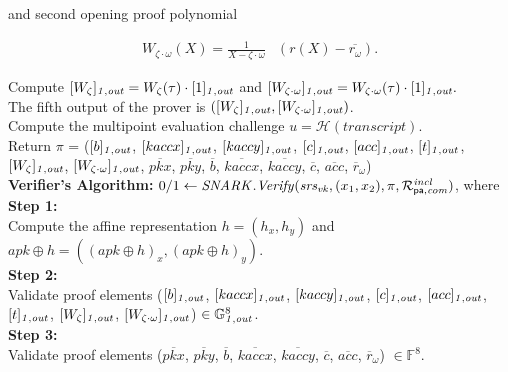 \noindent and second opening proof polynomial

\begin{align*}
W_{\zeta \cdot \omega}(X) = \frac{1}{X-\zeta \cdot \omega}&(r(X) - \overline{r_{\omega}}).
\end{align*}

\noindent Compute $[W_{\zeta}]_{\mathit{1,out}} = W_{\zeta}(\tau) \cdot [1]_{\mathit{1,out}}$ and $[W_{\zeta \cdot \omega}]_{\mathit{1,out}} = W_{\zeta \cdot \omega}(\tau) \cdot [1]_{\mathit{1,out}}.$ \\

\noindent The fifth output of the prover is $([W_{\zeta}]_{\mathit{1,out}}, [W_{\zeta \cdot \omega}]_{\mathit{1,out}})$. \\

\noindent Compute the multipoint evaluation challenge $u = \mathcal{H}(transcript)$. \\

\noindent Return $\pi$ = ($[b]_{\mathit{1,out}}$, $[kaccx]_{\mathit{1,out}}$, $[kaccy]_{\mathit{1,out}}$, $[c]_{\mathit{1,out}}$, $[acc]_{\mathit{1,out}}$, $[t]_{\mathit{1,out}}$, $[W_{\zeta}]_{\mathit{1,out}}$, 
$[W_{\zeta \cdot \omega}]_{\mathit{1,out}}$,  $\overline{pkx}$, $\overline{pky}$, $\overline{b}$, $\overline{kaccx}$, $\overline{kaccy}$, $\overline{c}$, 
$\overline{acc}$, $\overline{r}_{\omega}$) \\  

\noindent \textbf{Verifier's Algorithm:} $0/1 \leftarrow \mathit{SNARK.Verify}(\mathit{srs_{vk}}, (x_1, x_2), \pi, \mathcal{R}^{\mathit{incl}}_{\mathsf{pa},\mathit{com}})$, where\\ 

\noindent \textbf{Step 1:} \\
\noindent Compute the affine representation $h = (h_x, h_y)$ and  $apk \oplus h = ((apk \oplus h)_{x}, (apk \oplus h)_{y})$.\\

\noindent \textbf{Step 2:} \\
\noindent Validate proof elements ($[b]_{\mathit{1,out}}$, $[kaccx]_{\mathit{1,out}}$, $[kaccy]_{\mathit{1,out}}$, $[c]_{\mathit{1,out}}$, $[acc]_{\mathit{1,out}}$, $[t]_{\mathit{1,out}}$, 
$[W_{\zeta}]_{\mathit{1,out}}$, $[W_{\zeta \cdot \omega}]_{\mathit{1,out}}$) $ \in \mathbb{G}_{\mathit{1,out}}^{8}$. \\ 

\noindent \textbf{Step 3:} \\
\noindent Validate proof elements ($\overline{pkx}$, $\overline{pky}$, $\overline{b}$, $\overline{kaccx}$, 
$\overline{kaccy}$, $\overline{c}$, $\overline{acc}$, $\overline{r}_{\omega}$) $\in \mathbb{F}^{8}$. \\

